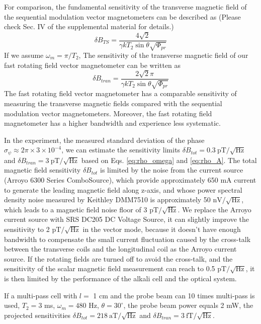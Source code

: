\documentclass[prx,twocolumn,10pt,nofootinbib]{revtex4-1}
\begin{document}
For comparison, the fundamental sensitivity of the transverse magnetic field of the sequential modulation vector magnetometers can be described as (Please check Sec. IV of the supplemental material for details.)
\begin{equation}
    \delta B_{TS} =  \frac{4\sqrt{2}}{\gamma k T_2 \sin \theta \sqrt{\Phi_{pr}}} 
\end{equation}
If we assume $\omega_m = \pi / T_2 $, The sensitivity of the transverse magnetic field of our fast rotating field vector magnetometer can be written as
\begin{equation}
    \delta B_{tran} = \frac{2\sqrt{2} \pi }{\gamma k T_2 \sin \theta \sqrt{\Phi_{pr}}}
\end{equation}
The fast rotating field vector magnetometer has a comparable sensitivity of measuring the transverse magnetic fields compared with the sequential modulation vector magnetometers. Moreover, the fast rotating field magnetometer has a higher bandwidth and experience less systematic. 

In the experiment, the measured standard deviation of the phase $\sigma_{\psi} \approx 2\pi \times 3 \times10^{-4}$, we can estimate the sensitivity limits $\delta B_{tot} = 0.3 ~\mathrm{pT/\sqrt{Hz}}$ and $\delta B_{tran} = 3 ~\mathrm{pT/\sqrt{Hz}}$ based on Eqs. \ref{eq:rho_omega} and \ref{eq:rho_A}. The total magnetic field sensitivity $\delta B_{tot}$ is limited by the noise from the current source (Arroyo 6300 Series ComboSource), which provide approximately 650 mA current to generate the leading magnetic field along z-axis, and whose power spectral density noise measured by Keithley DMM7510 is approximately 50 $\mathrm{nV/\sqrt{Hz}}$, which leads to a magnetic field noise floor of 3 $\mathrm{pT/\sqrt{Hz}}$. We replace the Arroyo current source with SRS DC205 DC Voltage Source, it can slightly improve the sensitivity to 2 $\mathrm{pT/\sqrt{Hz}}$ in the vector mode, because it doesn't have enough bandwidth to compensate the small current fluctuation caused by the cross-talk between the transverse coils and the longitudinal coil as the Arroyo current source. If the rotating fields are turned off to avoid the cross-talk, and the sensitivity of the scalar magnetic field measurement can reach to 0.5 $\mathrm{pT/\sqrt{Hz}}$, it is then limited by the performance of the alkali cell and the optical system.

If a multi-pass cell with $l=$ 1 cm and the probe beam can 10 times multi-pass is used, $T_2=3$ ms, $\omega_m = 480$ Hz, $\theta=30 ^{\circ}$, the probe beam power equals 2 mW, the projected sensitivities $\delta B_{tot} = 218 ~\mathrm{aT/\sqrt{Hz}}$ and $\delta B_{tran} = 3 ~\mathrm{fT/\sqrt{Hz}}$. 
\end{document}
